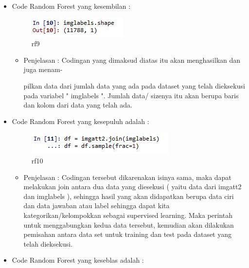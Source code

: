 \begin{enumerate}
\begin{itemize}
\begin{itemize}
\end{itemize}
\item Code Random Forest yang kesembilan :
\par
\begin{figure}[ht]
\centering
\includegraphics[scale=0.2]{figures/rfcahya9.jpg}
\caption{rf9}
\label{contoh}
\end{figure}
\par
\begin{itemize}
\item Penjelasan : Codingan yang dimaksud diatas itu  akan menghasilkan dan juga menam-
\par pilkan data dari jumlah data yang ada pada dataset yang telah dieksekusi pada variabel " imglabels ". Jumlah data/ sizenya itu akan berupa baris dan kolom dari data yang telah ada.
\par
\par
\end{itemize}
\item Code Random Forest yang kesepuluh adalah :
\par
\begin{figure}[ht]
\centering
\includegraphics[scale=0.2]{figures/rfcahya10.jpg}
\caption{rf10}
\label{contoh}
\end{figure}
\par
\begin{itemize}
\item Penjelasan : Codingan tersebut dikarenakan isinya sama, maka dapat melakukan join antara dua data yang diesekusi ( yaitu data dari imgatt2 dan imglabels ), sehingga hasil yang akan didapatkan berupa data ciri dan data jawaban atau label sehingga dapat kita  kategorikan/kelompokkan sebagai supervised learning. Maka perintah untuk menggabungkan kedua data tersebut, kemudian akan dilakukan pemisahan antara data set untuk training dan test pada dataset yang telah dieksekusi.
\par
\par
\end{itemize}
\item Code Random Forest yang keseblas adalah :
\par
\begin{figure}[ht]

\end{figure}
\end{itemize}
\end{enumerate}
